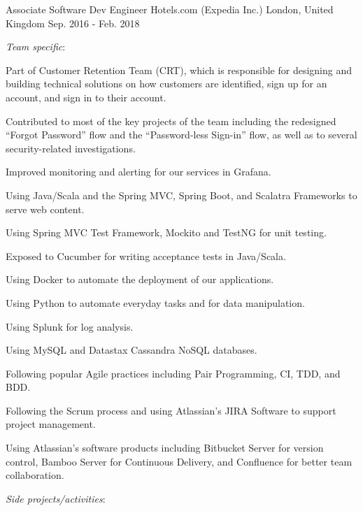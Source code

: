 \begin{cventries}
  \cventry
    {Associate Software Dev Engineer} %
    {Hotels.com (Expedia Inc.)} %
    {London, United Kingdom} %
    {Sep. 2016 - Feb. 2018} %
    {
    \textit{Team specific}:
    \vspace{12pt}
      \begin{cvitems} %
        \item {Part of Customer Retention Team (CRT), which is responsible for designing and building technical solutions on how customers are identified, sign up for an account, and sign in to their account.}
        \item {Contributed to most of the key projects of the team including the redesigned ``Forgot Password'' flow and the ``Password-less Sign-in'' flow, as well as to several security-related investigations.}
        \item{Improved monitoring and alerting for our services in Grafana.}
                \item {Using Java/Scala and the Spring MVC, Spring Boot, and Scalatra Frameworks to serve web content.}
        \item {Using Spring MVC Test Framework, Mockito and TestNG for unit testing.}
        \item{Exposed to Cucumber for writing acceptance tests in Java/Scala.}
        \item {Using Docker to automate the deployment of our applications.}
        \item {Using Python to automate everyday tasks and for data manipulation.}
        \item {Using Splunk for log analysis.}
       \item {Using MySQL and Datastax Cassandra NoSQL databases.}
        \item {Following popular Agile practices including Pair Programming, CI, TDD, and BDD.}
        \item {Following the Scrum process and using Atlassian's JIRA Software to support project management.}
        \item {Using Atlassian's software products including Bitbucket Server for version control, Bamboo Server for Continuous Delivery, and Confluence for better team collaboration.}
       \end{cvitems}
       \vspace{15pt}
       \textit{Side projects/activities}:
       \vspace{12pt}
}
\end{cventries}
